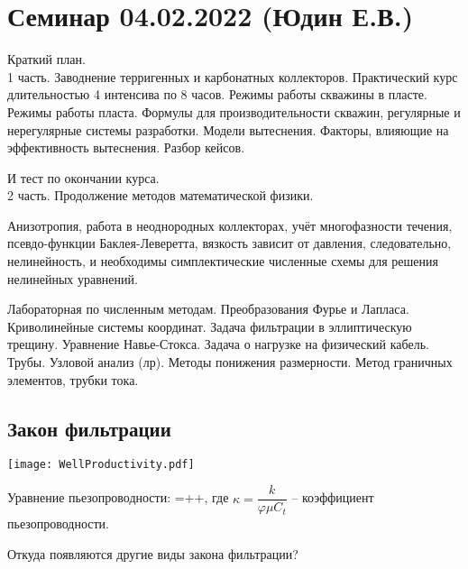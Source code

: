 \documentclass[main.tex]{subfiles}
\begin{document}
\section{Семинар 04.02.2022 (Юдин Е.В.)}

Краткий план.\\

1 часть. Заводнение терригенных и карбонатных коллекторов. Практический курс длительностью 4 интенсива по 8 часов. Режимы работы скважины в пласте. Режимы работы пласта. Формулы для производительности скважин, регулярные и нерегулярные системы разработки. Модели вытеснения. Факторы, влияющие на эффективность вытеснения. Разбор кейсов.

И тест по окончании курса.\\

2 часть. Продолжение методов математической физики.

Анизотропия, работа в неоднородных коллекторах, учёт многофазности течения, псевдо-функции Баклея-Леверетта, вязкость зависит от давления, следовательно, нелинейность, и необходимы симплектические численные схемы для решения нелинейных уравнений.

Лабораторная по численным методам. Преобразования Фурье и Лапласа. Криволинейные системы координат. Задача фильтрации в эллиптическую трещину. Уравнение Навье-Стокса. Задача о нагрузке на физический кабель. Трубы. Узловой анализ (лр). Методы понижения размерности. Метод граничных элементов, трубки тока.



\subsection{Закон фильтрации}
\texttt{[image: WellProductivity.pdf]}

Уравнение пьезопроводности:
\beq
{}=++,
\eeq
где $\kappa=\dfrac{k}{\varphi\mu C_t}$ -- коэффициент пьезопроводности.


Откуда появляются другие виды закона фильтрации?\\
\end{document}
